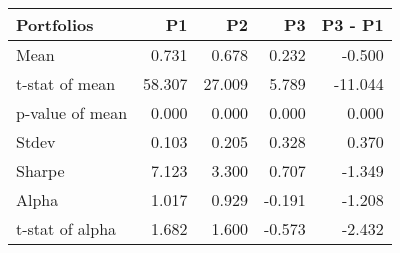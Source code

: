 \begin{tabular}{lrrrr}
\toprule
Portfolios & P1 & P2 & P3 & P3 - P1 \\
\midrule
Mean & 0.731 & 0.678 & 0.232 & -0.500 \\
t-stat of mean & 58.307 & 27.009 & 5.789 & -11.044 \\
p-value of mean & 0.000 & 0.000 & 0.000 & 0.000 \\
Stdev & 0.103 & 0.205 & 0.328 & 0.370 \\
Sharpe & 7.123 & 3.300 & 0.707 & -1.349 \\
Alpha & 1.017 & 0.929 & -0.191 & -1.208 \\
t-stat of alpha & 1.682 & 1.600 & -0.573 & -2.432 \\
\bottomrule
\end{tabular}
